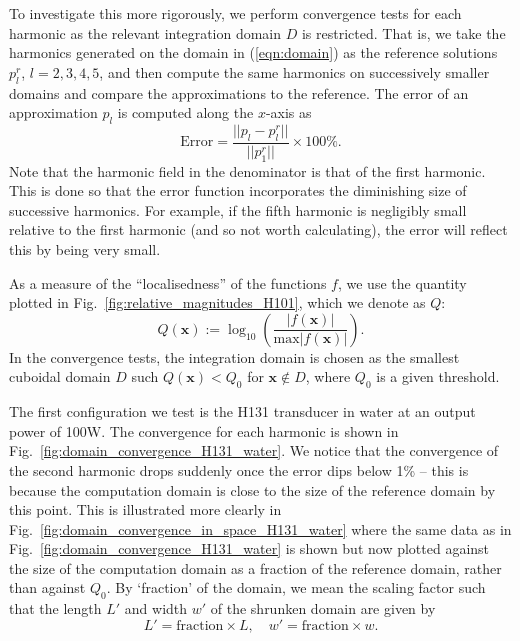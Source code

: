 \documentclass[preprint]{JASA}
\newcommand{\bx}{\mathbf{x}}
\newcommand{\red}[1]{{\color{red} #1}}
\begin{document}
To investigate this more rigorously, we perform convergence tests for each
harmonic as the relevant integration domain $D$ is restricted. That is, we take
the harmonics generated on the domain in (\ref{eqn:domain}) as the reference 
solutions $p_l^r$, $l=2,3,4,5$, and then compute the same harmonics on successively 
smaller domains and compare the approximations to the reference. 
The error of an approximation $p_l$ is computed along the $x$-axis as
\begin{equation}
    \text{Error} = \frac{||p_l-p_l^r||}
    {||p_1^r||}\times 100\%.
\end{equation}
Note that the harmonic
field in the denominator is that of the first harmonic. This is done so that the 
error function incorporates the diminishing size of successive harmonics. For example,
if the fifth harmonic is negligibly small relative to the first harmonic (and so
not worth calculating), the error will reflect this by being very small.

As a measure of the ``localisedness'' of the functions $f$, we use the quantity 
plotted in Fig.~\ref{fig:relative_magnitudes_H101}, which we denote as $Q$:
\begin{equation}
    Q(\bx) := \log_{10}\left(\frac{|f(\bx)|}{\text{max}|f(\bx)|}\right).
    \label{eqn:Q}
\end{equation}
In the convergence tests, the integration domain is chosen as the smallest 
cuboidal domain $D$ such $Q(\bx)<Q_0$ for $\bx\notin D$, where $Q_0$ is a 
given threshold.

The first configuration we test is the H131 transducer in water at an output power 
of 100W. The convergence for each harmonic is shown in Fig.~\ref{fig:domain_convergence_H131_water}.
We notice that the convergence of the second harmonic drops suddenly 
once the error dips below 1\% -- this is because the computation domain 
is close to the size of the reference domain by this point. This is illustrated 
more clearly in Fig.~\ref{fig:domain_convergence_in_space_H131_water} where the 
same data as in Fig.~\ref{fig:domain_convergence_H131_water} is shown but now 
plotted against the size of the computation domain as a fraction of the reference 
domain, rather than against $Q_0$. \red{By `fraction' of the domain, we mean 
the scaling factor such that the length $L'$ and width $w'$ of the shrunken domain 
are given by 
\[
    L' = \text{fraction}\times L,\quad w' = \text{fraction}\times w.    
\]
}
\end{document}
